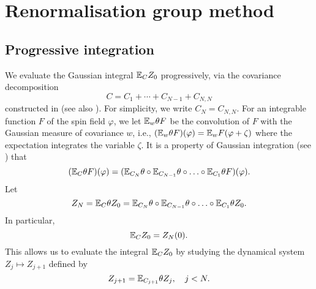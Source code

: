 \chapter{Renormalisation group method}




\section{Progressive integration}
\label{sec:prog}

We evaluate the Gaussian integral $\mathbb{E}_C Z_0$ progressively, via
the covariance decomposition
\begin{equation}
\label{e:NCj}
C = C_1 + \cdots + C_{N-1} + C_{N,N}
\end{equation}
constructed in \cite{Baue13a} (see also \cite{BGM04}). For simplicity, we write $C_N = C_{N,N}$.
For an integrable function $F$ of the spin field $\varphi$, we let
$\mathbb{E}_{w}\theta F$ be the convolution of $F$ with the Gaussian measure of covariance $w$, i.e.,
$(\mathbb{E}_w\theta F)(\varphi) = \mathbb{E}_wF(\varphi + \zeta)$ where the expectation integrates the
variable $\zeta$.
It is a property of Gaussian integration (see \cite{BS-rg-norm}) that
\begin{equation}
    (\mathbb{E}_C \theta F)(\varphi)
    =
    (\mathbb{E}_{C_N}\theta \circ \mathbb{E}_{C_{N-1}}\theta \circ \ldots \circ \mathbb{E}_{C_1}\theta F)
    (\varphi).
\end{equation}
Let \begin{equation}
Z_N = \mathbb{E}_C \theta Z_0
=
\mathbb{E}_{C_N}\theta \circ \mathbb{E}_{C_{N-1}}\theta \circ \ldots \circ \mathbb{E}_{C_1}\theta Z_0.
\end{equation}
In particular,
\begin{equation}
\mathbb{E}_C Z_0 = Z_N(0).
\end{equation}
This allows us to evaluate the integral $\mathbb{E}_C Z_0$ by studying the
dynamical system $Z_j \mapsto Z_{j+1}$ defined by
\begin{equation}
Z_{j+1} = \mathbb{E}_{C_{j+1}} \theta Z_j, \quad j < N.
\end{equation}

